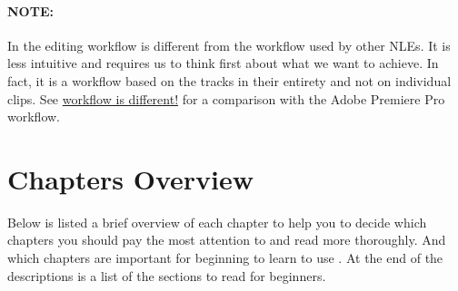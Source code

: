 \paragraph{NOTE:}  In \CGG{} the editing workflow is different from the workflow used by other NLEs. It is less intuitive and requires us to think first about what we want to achieve. In fact, it is a workflow based on the tracks in their entirety and not on individual clips. See \href{https://download.cinelerra-gg.org/download.php?file=\%2FWorkflow.pdf}{workflow is different!} for a comparison with the Adobe Premiere Pro workflow.

\section*{Chapters Overview}%
\label{sec:chapters_overview}

Below is listed a brief overview of each chapter to help you to decide which chapters you should pay the most attention to and read more thoroughly.
And which chapters are important for beginning to learn to use \CGG{}. At the end of the descriptions is a list of the sections to read for beginners.

